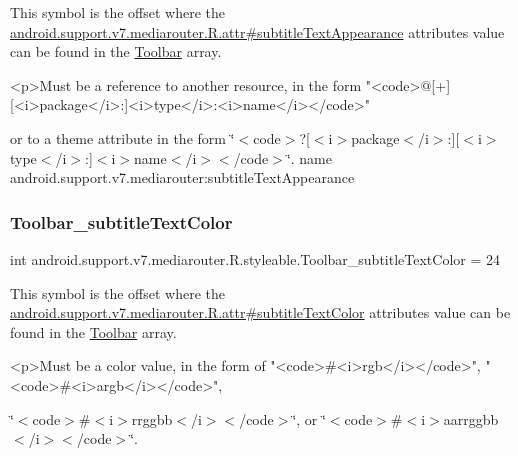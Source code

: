 This symbol is the offset where the \hyperlink{classandroid_1_1support_1_1v7_1_1mediarouter_1_1R_1_1attr_a04ae58aea15169a54ecf53faabb46f36}{android.\+support.\+v7.\+mediarouter.\+R.\+attr\#subtitle\+Text\+Appearance} attribute\textquotesingle{}s value can be found in the \hyperlink{classandroid_1_1support_1_1v7_1_1mediarouter_1_1R_1_1styleable_a6815cdfaadde30c82b955863af196899}{Toolbar} array.

\begin{DoxyVerb}      <p>Must be a reference to another resource, in the form "<code>@[+][<i>package</i>:]<i>type</i>:<i>name</i></code>"
\end{DoxyVerb}
 or to a theme attribute in the form \char`\"{}$<$code$>$?\mbox{[}$<$i$>$package$<$/i$>$\+:\mbox{]}\mbox{[}$<$i$>$type$<$/i$>$\+:\mbox{]}$<$i$>$name$<$/i$>$$<$/code$>$\char`\"{}.  name android.\+support.\+v7.\+mediarouter\+:subtitle\+Text\+Appearance \mbox{\label{classandroid_1_1support_1_1v7_1_1mediarouter_1_1R_1_1styleable_a22de0afbca4455a806f9f117c354cd60}} 
\subsubsection{\texorpdfstring{Toolbar\+\_\+subtitle\+Text\+Color}{Toolbar\_subtitleTextColor}}
{\footnotesize\ttfamily int android.\+support.\+v7.\+mediarouter.\+R.\+styleable.\+Toolbar\+\_\+subtitle\+Text\+Color = 24\hspace{0.3cm}{\ttfamily [static]}}

This symbol is the offset where the \hyperlink{classandroid_1_1support_1_1v7_1_1mediarouter_1_1R_1_1attr_ac92a9bbf6e485bae5fbbbbea6f8a2dd9}{android.\+support.\+v7.\+mediarouter.\+R.\+attr\#subtitle\+Text\+Color} attribute\textquotesingle{}s value can be found in the \hyperlink{classandroid_1_1support_1_1v7_1_1mediarouter_1_1R_1_1styleable_a6815cdfaadde30c82b955863af196899}{Toolbar} array.

\begin{DoxyVerb}      <p>Must be a color value, in the form of "<code>#<i>rgb</i></code>", "<code>#<i>argb</i></code>",
\end{DoxyVerb}
 \char`\"{}$<$code$>$\#$<$i$>$rrggbb$<$/i$>$$<$/code$>$\char`\"{}, or \char`\"{}$<$code$>$\#$<$i$>$aarrggbb$<$/i$>$$<$/code$>$\char`\"{}. 

